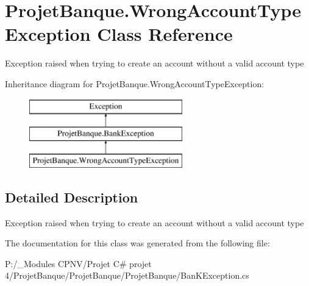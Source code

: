 \hypertarget{class_projet_banque_1_1_wrong_account_type_exception}{}\section{Projet\+Banque.\+Wrong\+Account\+Type\+Exception Class Reference}
\label{class_projet_banque_1_1_wrong_account_type_exception}


Exception raised when trying to create an account without a valid account type  


Inheritance diagram for Projet\+Banque.\+Wrong\+Account\+Type\+Exception\+:\begin{figure}[H]
\begin{center}
\leavevmode
\includegraphics[height=3.000000cm]{class_projet_banque_1_1_wrong_account_type_exception}
\end{center}
\end{figure}


\subsection{Detailed Description}
Exception raised when trying to create an account without a valid account type 



The documentation for this class was generated from the following file\+:\begin{DoxyCompactItemize}
\item 
P\+:/\+\_\+\+Modules C\+P\+N\+V/\+Projet C\# projet 4/\+Projet\+Banque/\+Projet\+Banque/\+Projet\+Banque/Ban\+K\+Exception.\+cs\end{DoxyCompactItemize}
